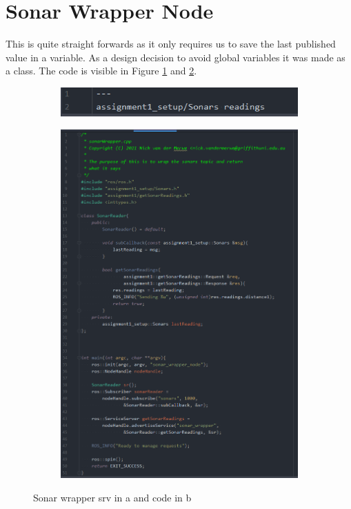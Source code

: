 \documentclass{article}
\begin{document}
\section{Sonar Wrapper Node}\label{sonarSection}
This is quite straight forwards as it only requires us to save the last
published value in a variable. As a design decision to avoid global variables it
was made as a class. The code is visible in Figure \ref{sonarSrv} and
\ref{sonarCode}. 
\begin{figure}[ht]
    \begin{subfigure}{.5\textwidth}
        \centering
        \includegraphics[scale=0.5]{img/sonar_wrapper_srv.png}
        \caption{}
        \label{sonarSrv}
    \end{subfigure}
    \begin{subfigure}{.5\textwidth}
        \centering
        \includegraphics[scale=0.25]{img/sonar_wrapper.png}
        \caption{}
        \label{sonarCode}
    \end{subfigure}
    \caption{Sonar wrapper srv in a and code in b}
    \label{sonarWrapper}
\end{figure}
\end{document}
